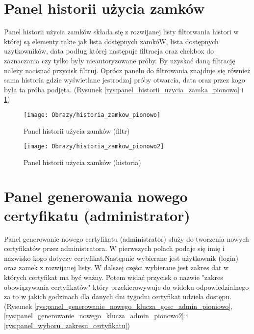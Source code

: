 	
	\section*{Panel historii użycia zamków}
	Panel historii użycia zamków składa się z rozwijanej listy filtorwania histori w której są elementy takie jak lista dostępnych zamkóW, lista dostępnych uzytkowników, data podług której następuje filtracja oraz chekbox do zaznaczania czy tylko były nieautoryzowane próby. By uzyskać daną filtrację należy nacisnać przycisk filtruj. Oprócz panelu do filtrowania znajduje się również sama historia gdzie wyświetlane jestrodzaj próby otwarcia, data oraz przez kogo była ta próba podjęta. (Rysunek \ref{rys:panel_historii_uzycia_zamka_pionowo} i \ref{rys:panel_historii_uzycia_zamka_pionowo2})
	
	\begin{figure}[ht!]
		\begin{minipage}{0.5\textwidth}
			\texttt{[image: Obrazy/historia\_zamkow\_pionowo]}
			\caption{Panel historii użycia zamków (filtr)}
			\label{rys:panel_historii_uzycia_zamka_pionowo}
		\end{minipage}
		\begin{minipage}{0.5\textwidth}
			\texttt{[image: Obrazy/historia\_zamkow\_pionowo2]}
			\caption{Panel historii użycia zamków (historia)}
			\label{rys:panel_historii_uzycia_zamka_pionowo2}	
		\end{minipage}
	\end{figure}
	\newpage
	
	\section*{Panel generowania nowego certyfikatu (administrator)}
	Panel generowanie nowego certyfikatu (administrator) służy do tworzenia nowych certyfikatów przez administratora. W pierwszych polach podaje się imię i nazwisko kogo dotyczy certyfikat.Następnie wybierane jest użytkownik (login) oraz zamek z rozwijanej listy. W dalszej części wybierane jest zakres dat w których certyfikat ma być ważny. Potem widać przycisk o nazwie "zakres obowiązywania certyfikatów" który przekierowywuje do widoku odpowiedzialnego za to w jakich godzinach dla danych dni tygodni certyfikat udziela dostępu. (Rysunek \ref{rys:panel_generowanie_nowego_klucza_gosc_admin_pioniowo}, \ref{rys:panel_generowanie_nowego_klucza_admin_pionowo2} i 
	\ref{rys:panel_wyboru_zakresu_certyfikatu})
	
